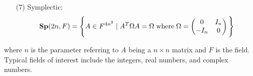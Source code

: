 \documentclass[12pt, letterpaper, onecolumn, conference, final]{IEEEtran}
\theoremstyle{definition}
\theoremstyle{plain}
\begin{document}
\begin{center}
\begin{itemize}
\item[(7)]
Symplectic:
\begin{equation*}
\textbf{Sp}(2n,F) = \Bigg\{ A \in F^{4n^2} \hspace{.1cm} | \hspace{.1cm} A^T\Omega A = \Omega \hspace{.1cm} \text{where} \hspace{.1cm} \Omega = \begin{pmatrix}
0 & I_n \\
-I_n & 0
\end{pmatrix} \Bigg\}
\end{equation*}

\end{itemize}
\end{center}
where $n$ is the parameter referring to $A$ being a $n \times n$ matrix and $F$ is the field. Typical fields of interest include the integers, real numbers, and complex numbers.

\newpage
\end{document}
